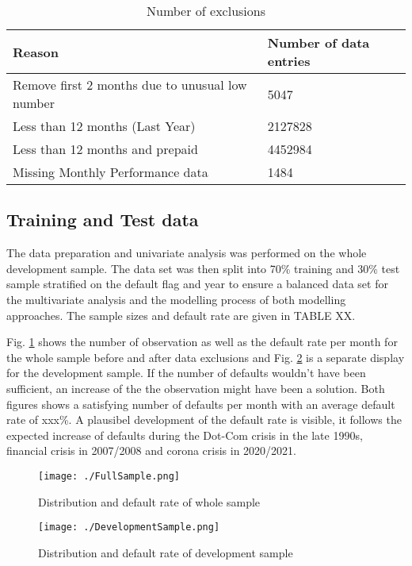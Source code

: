 \begin{table}[h!]
\centering
\begin{tabular}{ l l }\toprule          										
\textbf{Reason}                                       	& \textbf{Number of data entries} 	\\\midrule
Remove first 2 months due to unusual low number 		& 5047                   			\\
Less than 12 months (Last Year)                 		& 2127828                			\\
Less than 12 months and prepaid                 		& 4452984                			\\
Missing Monthly Performance data                		& 1484  				 			\\\bottomrule
\end{tabular}%
\caption{Number of exclusions}
\label{tab:re_nr_excl}
\end{table}

\subsection{Training and Test data}
The data preparation and univariate analysis was performed on the whole development sample. The data set was then split into 70\% training and 30\% test sample stratified on the default flag and year to ensure a balanced data set for the multivariate analysis and the modelling process of both modelling approaches. The sample sizes and default rate are given in TABLE XX.

Fig. \ref{fig:re_wholesample} shows the number of observation as well as the default rate per month for the whole sample before and after data exclusions and Fig. \ref{fig:re_devsample} is a separate display for the development sample. If the number of defaults wouldn't have been sufficient, an increase of the the observation might have been a solution. Both figures shows a satisfying number of defaults per month with an average default rate of xxx\%. A plausibel development of the default rate is visible, it follows the expected increase of defaults during the Dot-Com crisis in the late 1990s, financial crisis in 2007/2008 and corona crisis in 2020/2021. 

\begin{figure}[H]
	\centering
	\texttt{[image: ./FullSample.png]}
    \caption{Distribution and default rate of whole sample}
    \label{fig:re_wholesample}
\end{figure}
\begin{figure}[H]
	\centering
	\texttt{[image: ./DevelopmentSample.png]}
    \caption{Distribution and default rate of development sample}
    \label{fig:re_devsample}
\end{figure}

